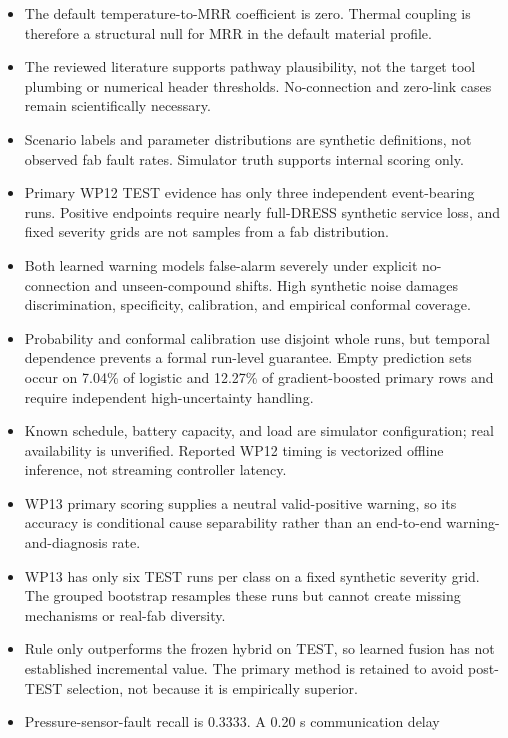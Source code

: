 \documentclass[10pt,twocolumn]{article}
\begin{document}
\begin{itemize}
  thermal, pad, wear, and dresser states. Numerical parameters are synthetic,
  not calibrated to a material/tool stack.
  \item The default temperature-to-MRR coefficient is zero. Thermal coupling
  is therefore a structural null for MRR in the default material profile.
  \item The reviewed literature supports pathway plausibility, not the target
  tool plumbing or numerical header thresholds. No-connection and zero-link
  cases remain scientifically necessary.
  \item Scenario labels and parameter distributions are synthetic definitions,
  not observed fab fault rates. Simulator truth supports internal scoring only.
  \item Primary WP12 TEST evidence has only three independent event-bearing
  runs. Positive endpoints require nearly full-DRESS synthetic service loss,
  and fixed severity grids are not samples from a fab distribution.
  \item Both learned warning models false-alarm severely under explicit
  no-connection and unseen-compound shifts. High synthetic noise damages
  discrimination, specificity, calibration, and empirical conformal coverage.
  \item Probability and conformal calibration use disjoint whole runs, but
  temporal dependence prevents a formal run-level guarantee. Empty prediction
  sets occur on 7.04\% of logistic and 12.27\% of gradient-boosted primary
  rows and require independent high-uncertainty handling.
  \item Known schedule, battery capacity, and load are simulator configuration;
  real availability is unverified. Reported WP12 timing is vectorized offline
  inference, not streaming controller latency.
  \item WP13 primary scoring supplies a neutral valid-positive warning, so its
  accuracy is conditional cause separability rather than an end-to-end
  warning-and-diagnosis rate.
  \item WP13 has only six TEST runs per class on a fixed synthetic severity
  grid. The grouped bootstrap resamples these runs but cannot create missing
  mechanisms or real-fab diversity.
  \item Rule only outperforms the frozen hybrid on TEST, so learned fusion has
  not established incremental value. The primary method is retained to avoid
  post-TEST selection, not because it is empirically superior.
  \item Pressure-sensor-fault recall is 0.3333. A 0.20 s communication delay

\end{itemize}
\end{document}
